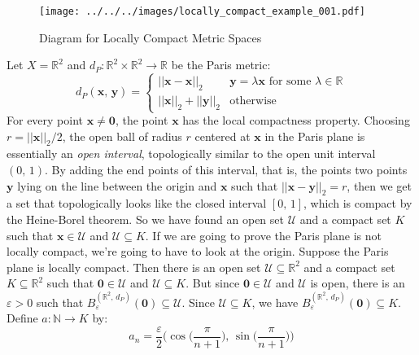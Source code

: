 \documentclass{article}
\theoremstyle{normal}
\begin{document}
    \begin{figure}[H]
        \centering
        \texttt{[image: ../../../images/locally\_compact\_example\_001.pdf]}
        \caption{Diagram for Locally Compact Metric Spaces}
        \label{fig:locally_compact_metric_space_001}
    \end{figure}
    \color{black}
    Let $X=\mathbb{R}^{2}$ and
    $d_{P}:\mathbb{R}^{2}\times\mathbb{R}^{2}\rightarrow\mathbb{R}$
    be the Paris metric:
    \begin{equation}
        d_{P}(\mathbf{x},\,\mathbf{y})=
        \begin{cases}
            ||\mathbf{x}-\mathbf{x}||_{2}&\mathbf{y}=\lambda\mathbf{x}
                \textrm{ for some }\lambda\in\mathbb{R}\\
            ||\mathbf{x}||_{2}+||\mathbf{y}||_{2}&\textrm{otherwise}
        \end{cases}
    \end{equation}
    For every point $\mathbf{x}\ne\mathbf{0}$, the point $\mathbf{x}$ has the
    local compactness property. Choosing $r=||\mathbf{x}||_{2}/2$, the
    open ball of radius $r$ centered at $\mathbf{x}$ in the Paris plane is
    essentially an \textit{open interval}, topologically similar to the open
    unit interval $(0,\,1)$. By adding the end points of this interval,
    that is, the points two points $\mathbf{y}$ lying on the line between the
    origin and $\mathbf{x}$ such that $||\mathbf{x}-\mathbf{y}||_{2}=r$, then
    we get a set that topologically looks like the closed interval
    $[0,\,1]$, which is compact by the Heine-Borel theorem. So we have found
    an open set $\mathcal{U}$ and a compact set $K$ such that
    $\mathbf{x}\in\mathcal{U}$ and $\mathcal{U}\subseteq{K}$. If we are going
    to prove the Paris plane is not locally compact, we're going to have to
    look at the origin. Suppose the Paris plane is locally compact. Then there
    is an open set $\mathcal{U}\subseteq\mathbb{R}^{2}$ and a compact set
    $K\subseteq\mathbb{R}^{2}$ such that $\mathbf{0}\in\mathcal{U}$ and
    $\mathcal{U}\subseteq{K}$. But since $\mathbf{0}\in\mathcal{U}$ and
    $\mathcal{U}$ is open, there is an $\varepsilon>0$ such that
    $B_{\varepsilon}^{(\mathbb{R}^{2},\,d_{P})}(\mathbf{0})\subseteq\mathcal{U}$.
    Since $\mathcal{U}\subseteq{K}$, we have
    $B_{\varepsilon}^{(\mathbb{R}^{2},\,d_{P})}(\mathbf{0})\subseteq{K}$.
    Define $a:\mathbb{N}\rightarrow{K}$ by:
    \begin{equation}
        a_{n}=\frac{\varepsilon}{2}\Big(
            \cos\big(\frac{\pi}{n+1}\big),\,\sin\big(\frac{\pi}{n+1}\big)
        \Big)
    \end{equation}
\end{document}
